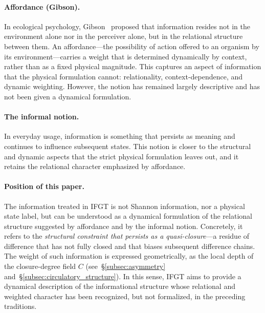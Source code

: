 \paragraph{Affordance (Gibson).}
In ecological psychology, Gibson~\cite{gibson1986} proposed that information resides not in the environment alone nor in the perceiver alone, but in the relational structure between them. An affordance---the possibility of action offered to an organism by its environment---carries a weight that is determined dynamically by context, rather than as a fixed physical magnitude. This captures an aspect of information that the physical formulation cannot: relationality, context-dependence, and dynamic weighting. However, the notion has remained largely descriptive and has not been given a dynamical formulation.

\paragraph{The informal notion.}
In everyday usage, information is something that persists as meaning and continues to influence subsequent states. This notion is closer to the structural and dynamic aspects that the strict physical formulation leaves out, and it retains the relational character emphasized by affordance.

\paragraph{Position of this paper.}
The information treated in IFGT is not Shannon information, nor a physical state label, but can be understood as a dynamical formulation of the relational structure suggested by affordance and by the informal notion. Concretely, it refers to the \emph{structural constraint that persists as a quasi-closure}---a residue of difference that has not fully closed and that biases subsequent difference chains. The weight of such information is expressed geometrically, as the local depth of the closure-degree field $C$ (see~§\ref{subsec:asymmetry} and~§\ref{subsec:circulatory_structure}). In this sense, IFGT aims to provide a dynamical description of the informational structure whose relational and weighted character has been recognized, but not formalized, in the preceding traditions.
